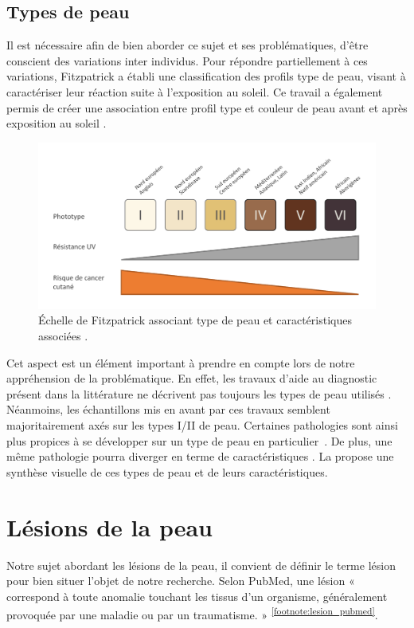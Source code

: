 \subsection{Types de peau}
Il est nécessaire afin de bien aborder ce sujet et ses problématiques, d’être conscient des variations inter individus. Pour répondre partiellement à ces variations, Fitzpatrick a établi une classification des profils type de peau, visant à caractériser leur réaction suite à l’exposition au soleil. Ce travail a également permis de créer une association entre profil type et couleur de peau avant et après exposition au soleil \cite{Fitzpatrick1988}. 
\begin{figure}[H]
    \centering
    \includegraphics[width=0.8\linewidth]{contents/chapter_1/resources/scheme_fitzpatrick_scale.pdf}
    \caption{Échelle de Fitzpatrick associant type de peau et caractéristiques associées \cite{Fitzpatrick1988}.}
    \label{fig:scheme_fitzpatrick_scale}
\end{figure}
Cet aspect est un élément important à prendre en compte lors de notre appréhension de la problématique. En effet, les travaux d'aide au diagnostic présent dans la littérature ne décrivent pas toujours les types de peau utilisés \cite{Celebi2007,Wiltgen2008,Koller2011}. Néanmoins, les échantillons mis en avant par ces travaux semblent majoritairement axés sur les types I/II de peau. Certaines pathologies sont ainsi plus propices à se développer sur un type de peau en particulier~\cite{Narayanan2010}. De plus, une même pathologie pourra diverger en terme de caractéristiques \cite{Tuma2015}. La  propose une synthèse visuelle de ces types de peau et de leurs caractéristiques.

\section{Lésions de la peau}
Notre sujet abordant les lésions de la peau, il convient de définir le terme lésion pour bien situer l’objet de notre recherche. Selon PubMed, une lésion « correspond à toute anomalie touchant les tissus d’un organisme, généralement provoquée par une maladie ou par un traumatisme. » \textsuperscript{\ref{footnote:lesion_pubmed}}.\par
\addtocounter{footnote}{1}

